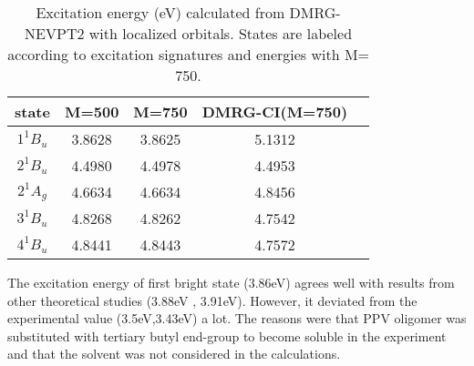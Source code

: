 \begin{table}
   \caption{Excitation energy (eV) calculated from DMRG-NEVPT2 with localized orbitals. States are labeled according to excitation signatures and energies with M= 750. }
  \label{table:local}
\begin{tabular}{ccccc}
\hline
  state &  M=500 & M=750 & DMRG-CI(M=750)\\
\hline
  $1^1B_u$ & 3.8628   &   3.8625   & 5.1312    \\
  $2^1B_u$ & 4.4980   &   4.4978   & 4.4953    \\
  $2^1A_g$ & 4.6634   &   4.6634   & 4.8456    \\
  $3^1B_u$ & 4.8268   &   4.8262   & 4.7542    \\
  $4^1B_u$ & 4.8441   &   4.8443   & 4.7572    \\
\hline
\end{tabular}
\end{table}

The excitation energy of first bright state (3.86eV) agrees well with results from other theoretical studies (3.88eV \cite{beljonne_theoretical_1995}, 3.91eV\cite{shukla_correlated_2002}). 
However, it deviated from the experimental value (3.5eV\cite{woo_optical_1993},3.43eV\cite{gelinck_measuring_2000}) a lot. The reasons were that PPV oligomer was substituted with tertiary butyl end-group to become soluble in the experiment and that the solvent was not considered in the calculations.

